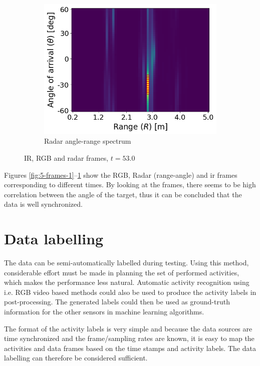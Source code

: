 \begin{figure}
\begin{subfigure}[t]{0.3\textwidth}
    \end{subfigure}
    \hfill
    \begin{subfigure}[t]{0.3\textwidth}
        \includegraphics[width=\textwidth]{fig/5/radar_t_53.0.png}
        \caption{Radar angle-range spectrum}
    \end{subfigure}
    \caption{IR, RGB and radar frames, $t = 53.0$}
    \label{fig:5-frames-3}
\end{figure}

Figures \ref{fig:5-frames-1}--\ref{fig:5-frames-3} show the RGB, Radar (range-angle) and \gls{ir} frames
corresponding to different times. By looking at the frames, there seems to be high correlation between
the angle of the target, thus it can be concluded that the data is well synchronized.

\section{Data labelling}
The data can be semi-automatically labelled during testing.
Using this method, considerable effort must be made in planning the set of performed activities,
which makes the performance less natural.
Automatic activity recognition using i.e. RGB video based methods could also be used to produce the activity labels
in post-processing.
The generated labels could then be used as ground-truth information for the other sensors in machine learning algorithms.

The format of the activity labels is very simple and because the data sources are time synchronized and the frame/sampling rates are known,
it is easy to map the activities and data frames based on the time stamps and activity labels.
The data labelling can therefore be considered sufficient.


